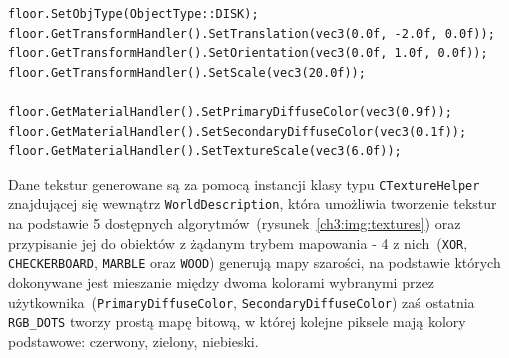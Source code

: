 \begin{lstlisting}[caption=Przykład konfiguracji obiektu \texttt{floor}. Za pomocą odpowiednich funkcji \texttt{Set*()} można dokonać zmiany wartości dowolnych parametrów interpretowanych przez \textsc{ViRay()}]
floor.SetObjType(ObjectType::DISK);
floor.GetTransformHandler().SetTranslation(vec3(0.0f, -2.0f, 0.0f));
floor.GetTransformHandler().SetOrientation(vec3(0.0f, 1.0f, 0.0f));
floor.GetTransformHandler().SetScale(vec3(20.0f));

floor.GetMaterialHandler().SetPrimaryDiffuseColor(vec3(0.9f));
floor.GetMaterialHandler().SetSecondaryDiffuseColor(vec3(0.1f));
floor.GetMaterialHandler().SetTextureScale(vec3(6.0f));
\end{lstlisting}

Dane tekstur generowane są za pomocą instancji klasy typu \texttt{CTextureHelper} znajdującej się wewnątrz \texttt{WorldDescription}, która umożliwia tworzenie tekstur na podstawie 5 dostępnych algorytmów~(rysunek~\ref{ch3:img:textures}) oraz przypisanie jej do obiektów z żądanym trybem mapowania - 4 z nich~(\texttt{XOR}, \texttt{CHECKERBOARD}, \texttt{MARBLE} oraz \texttt{WOOD}) generują mapy szarości, na podstawie których dokonywane jest mieszanie między dwoma kolorami wybranymi przez użytkownika~(\texttt{PrimaryDiffuseColor}, \texttt{SecondaryDiffuseColor}) zaś ostatnia \texttt{RGB\_DOTS} tworzy prostą mapę bitową, w której kolejne piksele mają kolory podstawowe: czerwony, zielony, niebieski.

